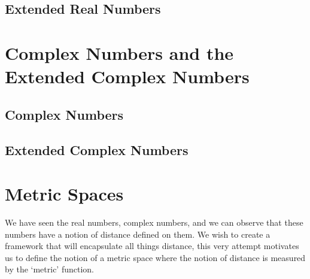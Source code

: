 \subsection{Extended Real Numbers}
\section{Complex Numbers and the Extended Complex Numbers}
\subsection{Complex Numbers}
\subsection{Extended Complex Numbers}
\section{Metric Spaces}
We have seen the real numbers, complex numbers, and we can observe that these numbers have a notion of distance defined on them. We wish to create a framework that will encapsulate all things distance, this very attempt motivates us to define the notion of a metric space where the notion of distance is measured by the `metric' function.
